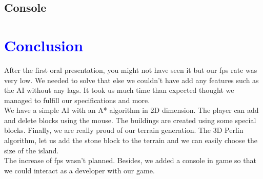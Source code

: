 \documentclass[article]{report} %
\begin{document}
			\section{Console}
				

		\chapter{\textcolor{blue}{Conclusion}}
			After the first oral presentation, you might not have seen it but our fps rate was very low. We needed to solve that else we couldn't have add any features such as the AI without any lags.  It took us much time than expected thought we managed to fulfill our specifications and more. \\

We have a simple AI with an A* algorithm in 2D dimension. The player can add and delete blocks using the mouse. The buildings are created using some special blocks. Finally, we are really proud of our terrain generation. The 3D Perlin algorithm, let us add the stone block to the terrain and we can easily choose the size of the island.\\

The increase of fps wasn't planned. Besides, we added a console in game so that we could interact as a developer with our game.
\end{document}
